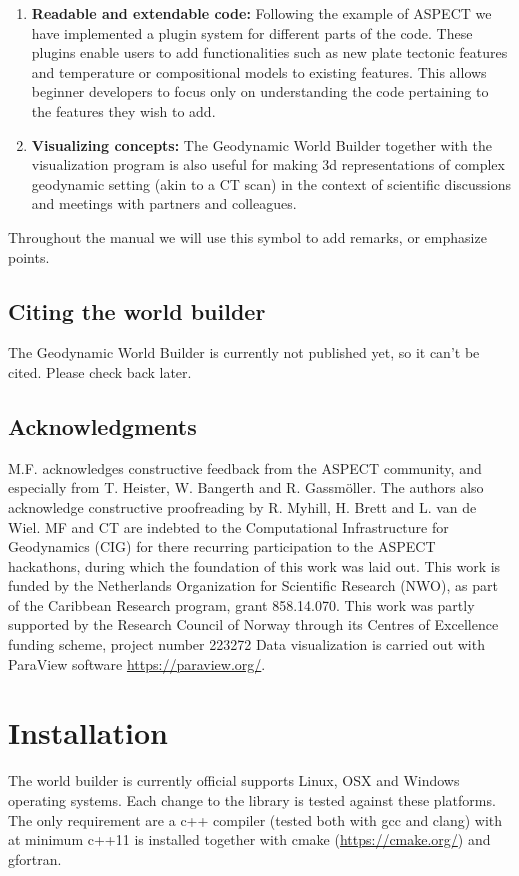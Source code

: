 \documentclass{book}
\newcommand{\GWB}{{Geodynamic World Builder}}
\newcommand{\aspect}{{ASPECT}}
\newcommand{\cmake}{{cmake}}
\begin{document}
\begin{enumerate}
    \item {\bf Readable and extendable code:} Following the example of \aspect{} we have implemented a plugin system for different parts of the code. These plugins enable users to add functionalities such as new plate tectonic features and temperature or compositional models to existing features. This allows beginner developers to focus only on understanding the code pertaining to the features they wish to add. 
    
    \item {\bf Visualizing concepts:} The \GWB{} together with the visualization program is also useful for making 3d representations of complex geodynamic setting (akin to a CT scan) in the context of scientific discussions and meetings with partners and colleagues. 
\end{enumerate}

\begin{remark}
Throughout the manual we will use this symbol to add remarks, or emphasize points.
\end{remark}


\section{Citing the world builder}
The \GWB{} is currently not published yet, so it can't be cited. Please check back later.
\section{Acknowledgments}
M.F. acknowledges constructive feedback from the ASPECT community, and especially from T. Heister, W. Bangerth and R. Gassm\"oller. The authors also acknowledge constructive proofreading by R. Myhill, H. Brett and L. van de Wiel. MF and CT are indebted to the Computational Infrastructure for Geodynamics (CIG) for there recurring participation to the ASPECT hackathons, during which the foundation of this work was laid out.
This work is funded by the Netherlands Organization for Scientific Research (NWO), as part of the Caribbean Research program, grant 858.14.070. This work was partly supported by the Research Council of Norway through its Centres of Excellence funding scheme, project number 223272
Data visualization is carried out with ParaView software \url{https://paraview.org/}.


\chapter{Installation}
\label{chapter:installation}
The world builder is currently official supports Linux, OSX and Windows operating systems. Each change to the library is tested against these platforms. The only requirement are a c++ compiler (tested both with gcc and clang) with at minimum c++11 is installed together with \cmake{} (\url{https://cmake.org/}) and gfortran. 
\end{document}
